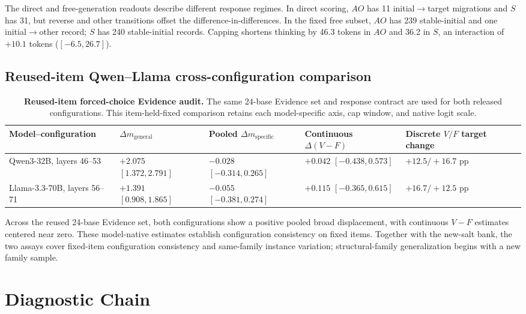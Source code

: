 \documentclass[letterpaper]{article}
\begin{document}
The direct and free-generation readouts describe different response regimes.  In direct scoring, $AO$ has 11 initial$\rightarrow$target migrations and $S$ has 31, but reverse and other transitions offset the difference-in-differences.  In the fixed free subset, $AO$ has 239 stable-initial and one initial$\rightarrow$other record; $S$ has 240 stable-initial records.  Capping shortens thinking by 46.3 tokens in $AO$ and 36.2 in $S$, an interaction of $+10.1$ tokens ($[-6.5,26.7]$).

\subsection{Reused-item Qwen--Llama cross-configuration comparison}

\begin{table}[t]
\centering
\small
\begin{tabular}{L{3.3cm}L{3.0cm}L{3.0cm}L{3.0cm}L{2.4cm}}
\toprule
Model--configuration & $\Delta m_{\mathrm{general}}$ & Pooled $\Delta m_{\mathrm{specific}}$ & Continuous $\Delta(V-F)$ & Discrete $V/F$ target change \\
\midrule
Qwen3-32B, layers 46--53 & $+2.075$ $[1.372,2.791]$ & $-0.028$ $[-0.314,0.265]$ & $+0.042$ $[-0.438,0.573]$ & $+12.5/+16.7$ pp \\
Llama-3.3-70B, layers 56--71 & $+1.391$ $[0.908,1.865]$ & $-0.055$ $[-0.381,0.274]$ & $+0.115$ $[-0.365,0.615]$ & $+16.7/+12.5$ pp \\
\bottomrule
\end{tabular}
\caption{\textbf{Reused-item forced-choice Evidence audit.} The same 24-base Evidence set and response contract are used for both released configurations.  This item-held-fixed comparison retains each model-specific axis, cap window, and native logit scale.}
\label{tab:supp-xm}
\end{table}

Across the reused 24-base Evidence set, both configurations show a positive pooled broad displacement, with continuous $V-F$ estimates centered near zero.  These model-native estimates establish configuration consistency on fixed items.  Together with the new-salt bank, the two assays cover fixed-item configuration consistency and same-family instance variation; structural-family generalization begins with a new family sample.

\section{Diagnostic Chain}
\label{supp:diagnostics}
\end{document}
